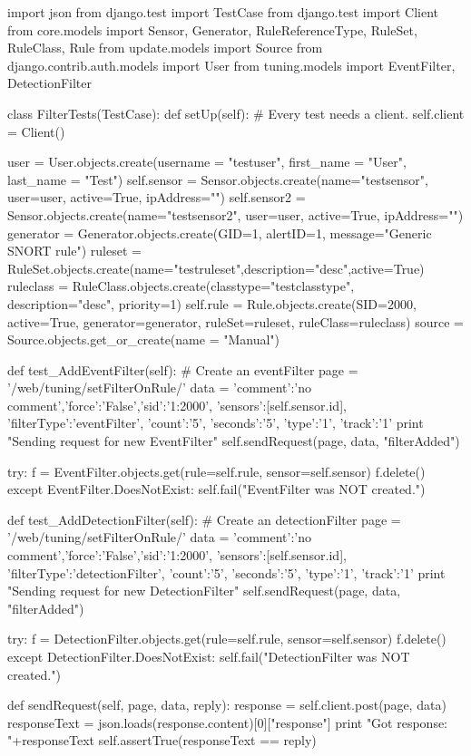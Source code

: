 \begin{python}[breaklines=true]
import json
from django.test import TestCase
from django.test import Client
from core.models import Sensor, Generator, RuleReferenceType, RuleSet, RuleClass, Rule
from update.models import Source
from django.contrib.auth.models import User
from tuning.models import EventFilter, DetectionFilter

class FilterTests(TestCase):
  def setUp(self):
    # Every test needs a client.
    self.client = Client()
    
    user = User.objects.create(username = "testuser", first_name = "User", last_name = "Test")
    self.sensor = Sensor.objects.create(name="testsensor", user=user, active=True, ipAddress="")
    self.sensor2 = Sensor.objects.create(name="testsensor2", user=user, active=True, ipAddress="")
    generator = Generator.objects.create(GID=1, alertID=1, message="Generic SNORT rule")
    ruleset = RuleSet.objects.create(name="testruleset",description="desc",active=True)
    ruleclass = RuleClass.objects.create(classtype="testclasstype", description="desc", priority=1)
    self.rule = Rule.objects.create(SID=2000, active=True, generator=generator, ruleSet=ruleset, ruleClass=ruleclass)
    source = Source.objects.get_or_create(name = "Manual")

  def test_AddEventFilter(self):
    # Create an eventFilter
    page = '/web/tuning/setFilterOnRule/'
    data = {'comment':'no comment','force':'False','sid':'1:2000', 'sensors':[self.sensor.id], 'filterType':'eventFilter', 'count':'5', 'seconds':'5', 'type':'1', 'track':'1'}
    print "Sending request for new EventFilter"
    self.sendRequest(page, data, "filterAdded")
    
    try:
      f = EventFilter.objects.get(rule=self.rule, sensor=self.sensor)
      f.delete()
    except EventFilter.DoesNotExist:
      self.fail("EventFilter was NOT created.")  
    
  def test_AddDetectionFilter(self):
    # Create an detectionFilter
    page = '/web/tuning/setFilterOnRule/'
    data = {'comment':'no comment','force':'False','sid':'1:2000', 'sensors':[self.sensor.id], 'filterType':'detectionFilter', 'count':'5', 'seconds':'5', 'type':'1', 'track':'1'}
    print "Sending request for new DetectionFilter"
    self.sendRequest(page, data, "filterAdded")

    try:
      f = DetectionFilter.objects.get(rule=self.rule, sensor=self.sensor)
      f.delete()
    except DetectionFilter.DoesNotExist:
      self.fail("DetectionFilter was NOT created.")
      
  def sendRequest(self, page, data, reply):
    response = self.client.post(page, data)
    responseText = json.loads(response.content)[0]["response"]
    print "Got response: "+responseText
    self.assertTrue(responseText == reply)
\end{python}